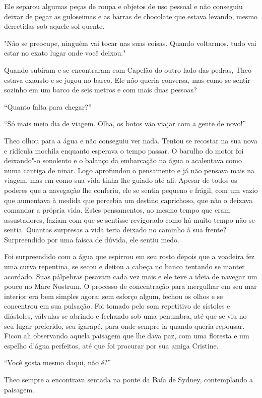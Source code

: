 Ele separou algumas peças de roupa e objetos de uso pessoal e não
conseguiu deixar de pegar as guloseimas e as barras de chocolate que
estava levando, mesmo derretidas sob aquele sol quente.

"Não se preocupe, ninguém vai tocar nas suas coisas. Quando voltarmos,
tudo vai estar no exato lugar onde você deixou."

Quando subiram e se encontraram com Capelão do outro lado das pedras,
Theo estava exausto e se jogou no barco. Ele não queria conversa, mas
como se sentir sozinho em um barco de seis metros e com mais duas
pessoas?

``Quanto falta para chegar?''

``Só mais meio dia de viagem. Olha, os botos vão viajar com a gente de
novo!''

Theo olhou para a água e não conseguiu ver nada. Tentou se recostar na
sua nova e ridícula mochila enquanto esperava o tempo passar. O barulho
do motor foi deixando"-o sonolento e o balanço da embarcação na água o
acalentava como numa cantiga de ninar. Logo aprofundou o pensamento e já
não pensava mais na viagem, mas em como sua vida tinha lhe guiado até
ali. Apesar de todos os poderes que a navegação lhe conferiu, ele se
sentia pequeno e frágil, com um vazio que aumentava à medida que
percebia um destino caprichoso, que não o deixava comandar a própria
vida. Estes pensamentos, ao mesmo tempo que eram assustadores, faziam
com que se sentisse revigorado como há muito tempo não se sentia.
Quantas surpresas a vida teria deixado no caminho à sua frente?
Surpreendido por uma faísca de dúvida, ele sentiu medo.

Foi surpreendido com a água que espirrou em seu rosto depois que a
voadeira fez uma curva repentina, se secou e deitou a cabeça no banco
tentando se manter acordado. Suas pálpebras pesavam cada vez mais e ele
teve a ideia de navegar um pouco no Mare Nostrum. O processo de
concentração para mergulhar em seu mar interior era bem simples agora;
sem esforço algum, fechou os olhos e se concentrou em sua pulsação. Foi
tomado pelo som repetitivo de sístoles e diástoles, válvulas se abrindo
e fechando sob uma penumbra, até que se viu no seu lugar preferido, seu
igarapé, para onde sempre ia quando queria repousar. Ficou ali
observando aquela paisagem que lhe dava paz, com uma floresta e um
espelho d'água perfeitos, até que foi procurar por sua amiga Cristine.

``Você gosta mesmo daqui, não é?''

Theo sempre a encontrava sentada na ponte da Baía de Sydney,
contemplando a paisagem.

